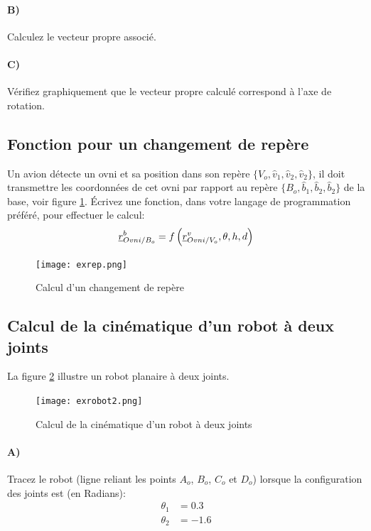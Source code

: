 \paragraph{B)} Calculez le vecteur propre associé.
\paragraph{C)} Vérifiez graphiquement que le vecteur propre calculé correspond à l’axe de rotation.


\subsection{Fonction pour un changement de repère}

Un avion détecte un ovni et sa position dans son repère $\{ V_o, \hat{v}_1, \hat{v}_2, \hat{v}_2\}$, il doit transmettre les coordonnées de cet ovni par rapport au repère $\{ B_o, \hat{b}_1, \hat{b}_2, \hat{b}_2\}$ de la base, voir figure \ref{fig:exrep}. Écrivez une fonction, dans votre langage de programmation préféré, pour effectuer le calcul:
\begin{align}
\underline{r}^b_{Ovni/B_o} = f\left( \underline{r}^v_{Ovni/V_o}, \theta, h, d\right)
\end{align} 
\begin{figure}[H]
	\centering
		\texttt{[image: exrep.png]}
	\caption{Calcul d'un changement de repère}
	\label{fig:exrep}
\end{figure}


\subsection{Calcul de la cinématique d'un robot à deux joints}

La figure \ref{fig:exrobot2} illustre un robot planaire à deux joints. 
\begin{figure}[H]
	\centering
		\texttt{[image: exrobot2.png]}
	\caption{Calcul de la cinématique d'un robot à deux joints}
	\label{fig:exrobot2}
\end{figure}

\paragraph{A)}
Tracez le robot (ligne reliant les points $A_o$, $B_o$, $C_o$ et $D_o$) lorsque la configuration des joints est (en Radians):
\begin{align}
\theta_1 &= 0.3 \\
\theta_2 &= -1.6
\end{align} 


